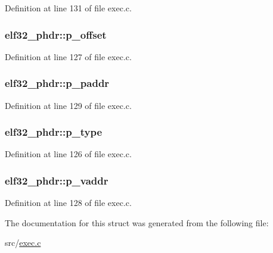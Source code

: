Definition at line 131 of file exec.\+c.

\hypertarget{structelf32__phdr_af88bab5054a39a619ff2f8a5424c3316}{
\subsubsection[{p\+\_\+offset}]{ elf32\+\_\+phdr\+::p\+\_\+offset}}\label{structelf32__phdr_af88bab5054a39a619ff2f8a5424c3316}


Definition at line 127 of file exec.\+c.

\hypertarget{structelf32__phdr_a7a76a0d640bab3bfdbf48ffd14d40fe9}{
\subsubsection[{p\+\_\+paddr}]{ elf32\+\_\+phdr\+::p\+\_\+paddr}}\label{structelf32__phdr_a7a76a0d640bab3bfdbf48ffd14d40fe9}


Definition at line 129 of file exec.\+c.

\hypertarget{structelf32__phdr_ac875c2371d8cf5e6e2084050ae6ccf73}{
\subsubsection[{p\+\_\+type}]{ elf32\+\_\+phdr\+::p\+\_\+type}}\label{structelf32__phdr_ac875c2371d8cf5e6e2084050ae6ccf73}


Definition at line 126 of file exec.\+c.

\hypertarget{structelf32__phdr_a4ce34fb0d117afd27046b923756faa11}{
\subsubsection[{p\+\_\+vaddr}]{ elf32\+\_\+phdr\+::p\+\_\+vaddr}}\label{structelf32__phdr_a4ce34fb0d117afd27046b923756faa11}


Definition at line 128 of file exec.\+c.



The documentation for this struct was generated from the following file\+:\begin{DoxyCompactItemize}
\item 
src/\hyperlink{exec_8c}{exec.\+c}\end{DoxyCompactItemize}
